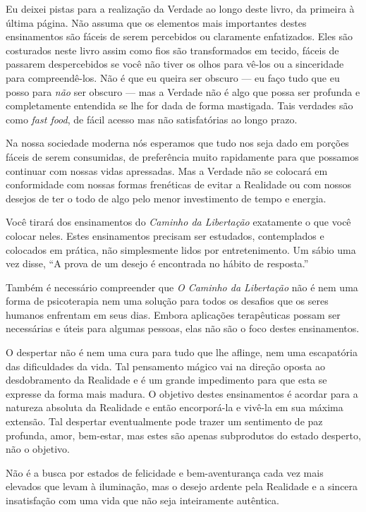 Eu deixei pistas para a realização da Verdade ao longo deste livro, da primeira à última página. Não assuma que os elementos mais importantes destes ensinamentos são fáceis de serem percebidos ou claramente enfatizados. Eles são costurados neste livro assim como fios são transformados em tecido, fáceis de passarem despercebidos se você não tiver os olhos para vê-los ou a sinceridade para compreendê-los. Não é que eu queira ser obscuro --- eu faço tudo que eu posso para \emph{não} ser obscuro --- mas a Verdade não é algo que possa ser profunda e completamente entendida se lhe for dada de forma mastigada. Tais verdades são como \emph{fast food}, de fácil acesso mas não satisfatórias ao longo prazo.

Na nossa sociedade moderna nós esperamos que tudo nos seja dado em porções fáceis de serem consumidas, de preferência muito rapidamente para que possamos continuar com nossas vidas apressadas. Mas a Verdade não se colocará em conformidade com nossas formas frenéticas de evitar a Realidade ou com nossos desejos de ter o todo de algo pelo menor investimento de tempo e energia.

Você tirará dos ensinamentos do \emph{Caminho da Libertação} exatamente o que você colocar neles. Estes ensinamentos precisam ser estudados, contemplados e colocados em prática, não simplesmente lidos por entretenimento. Um sábio uma vez disse, ``A prova de um desejo é encontrada no hábito de resposta.''

Também é necessário compreender que \emph{O Caminho da Libertação} não é nem uma forma de psicoterapia nem uma solução para todos os desafios que os seres humanos enfrentam em seus dias. Embora aplicações terapêuticas possam ser necessárias e úteis para algumas pessoas, elas não são o foco destes ensinamentos.

O despertar não é nem uma cura para tudo que lhe aflinge, nem uma escapatória das dificuldades da vida. Tal pensamento mágico vai na direção oposta ao desdobramento da Realidade e é um grande impedimento para que esta se expresse da forma mais madura. O objetivo destes ensinamentos é acordar para a natureza absoluta da Realidade e então encorporá-la e vivê-la em sua máxima extensão. Tal despertar eventualmente pode trazer um sentimento de paz profunda, amor, bem-estar, mas estes são apenas subprodutos do estado desperto, não o objetivo.

Não é a busca por estados de felicidade e bem-aventurança cada vez mais elevados que levam à iluminação, mas o desejo ardente pela Realidade e a sincera insatisfação com uma vida que não seja inteiramente autêntica.

